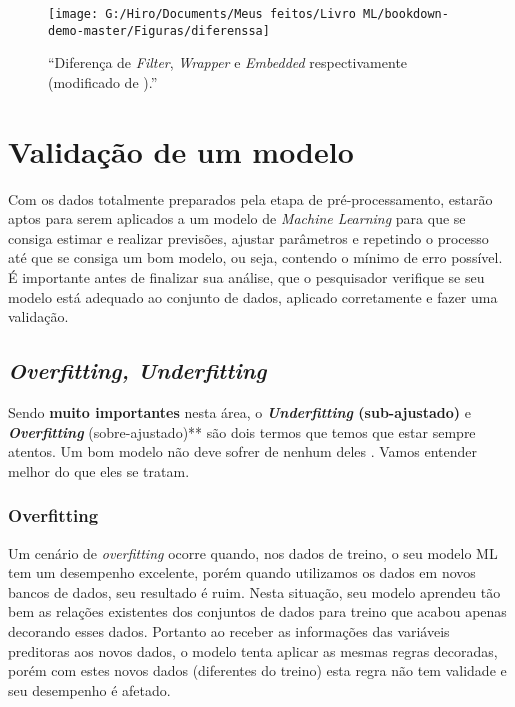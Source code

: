 \documentclass[
  openany]{book}
\begin{document}
\begin{figure}

{\centering \texttt{[image: G:/Hiro/Documents/Meus feitos/Livro ML/bookdown-demo-master/Figuras/diferenssa]} 

}

\caption{``Diferença de \emph{Filter}, \emph{Wrapper} e \emph{Embedded} respectivamente (modificado de \citet{covoes2010seleccao}).''}\label{fig:diferenssa}
\end{figure}



\hypertarget{valid}{%
\chapter{Validação de um modelo}\label{valid}}

Com os dados totalmente preparados pela etapa de pré-processamento, estarão aptos para serem aplicados a um modelo de \emph{Machine Learning} para que se consiga estimar e realizar previsões, ajustar parâmetros e repetindo o processo até que se consiga um bom modelo, ou seja, contendo o mínimo de erro possível. É importante antes de finalizar sua análise, que o pesquisador verifique se seu modelo está adequado ao conjunto de dados, aplicado corretamente e fazer uma validação.

\hypertarget{fitt}{%
\section{\texorpdfstring{\emph{Overfitting, Underfitting}}{Overfitting, Underfitting}}\label{fitt}}

Sendo \textbf{muito importantes} nesta área, o \textbf{\emph{Underfitting} (sub-ajustado)} e \textbf{\emph{Overfitting}} (sobre-ajustado)** são dois termos que temos que estar sempre atentos. Um bom modelo não deve sofrer de nenhum deles \citep{silver2013sinal}. Vamos entender melhor do que eles se tratam.

\hypertarget{overfitting}{%
\subsection{\texorpdfstring{\textbf{Overfitting}}{Overfitting}}\label{overfitting}}

Um cenário de \emph{overfitting} ocorre quando, nos dados de treino, o seu modelo ML tem um desempenho excelente, porém quando utilizamos os dados em novos bancos de dados, seu resultado é ruim. Nesta situação, seu modelo aprendeu tão bem as relações existentes dos conjuntos de dados para treino que acabou apenas decorando esses dados. Portanto ao receber as informações das variáveis preditoras aos novos dados, o modelo tenta aplicar as mesmas regras decoradas, porém com estes novos dados (diferentes do treino) esta regra não tem validade e seu desempenho é afetado.
\end{document}
